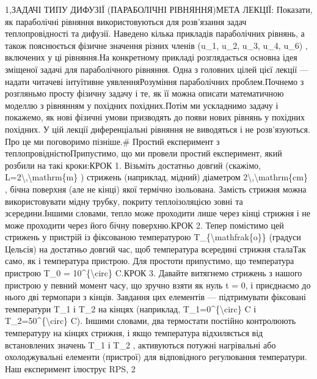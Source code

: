 \documentclass[
  ukrainian,
]{article}
\begin{document}
{{1,}{ЗАДАЧІ ТИПУ ДИФУЗІЇ (ПАРАБОЛІЧНІ РІВНЯННЯ)МЕТА ЛЕКЦІЇ: Показати, як параболічні рівняння використовуються для розв'язання задач теплопровідності та дифузії. Наведено кілька прикладів параболічних рівнянь, а також пояснюється фізичне значення різних членів (u\_1, u\_2, u\_3, u\_4, u\_6) , включених у ці рівняння.На конкретному прикладі розглядається основна ідея зміщеної задачі для параболічного рівняння. Одна з головних цілей цієї лекції --- надати читачеві інтуїтивне уявленняРозуміння параболічних проблем.Почнемо з розгляньмо просту фізичну задачу і те, як її можна описати математичною моделлю з рівнянням у похідних похідних.Потім ми ускладнимо задачу і покажемо, як нові фізичні умови призводять до появи нових рівнянь у похідних похідних. У цій лекції диференціальні рівняння не виводяться і не розв'язуються. Про це ми поговоримо пізніше.\# Простий експеримент з теплопровідністюПрипустимо, що ми провели простий експеримент, який розбили на такі кроки:КРОК 1. Візьміть достатньо довгий (скажімо, L=2\textbackslash,\textbackslash mathrm\{m\} ) стрижень (наприклад, мідний) діаметром 2\textbackslash,\textbackslash mathrm\{cm\} , бічна поверхня (але не кінці) якої термічно ізольована. Замість стрижня можна використовувати мідну трубку, покриту теплоізоляцією зовні та зсередини.Іншими словами, тепло може проходити лише через кінці стрижня і не може проходити через його бічну поверхню.КРОК 2. Тепер помістимо цей стрижень у пристрій із фіксованою температурою T\_\{\textbackslash mathfrak\{o\}\} (градуси Цельсія) на достатньо довгий час, щоб температура всередині стрижня сталаТак само, як і температура пристрою. Для простоти припустимо, що температура пристрою T\_0 = 10\^{}\{\textbackslash circ\} C.КРОК 3. Давайте витягнемо стрижень з нашого пристрою у певний момент часу, що зручно взяти як нуль t = 0, і приєднаємо до нього дві термопари з кінців. Завдання цих елементів --- підтримувати фіксовані температури T\_1 і T\_2 на кінцях (наприклад, T\_1=0\^{}\{\textbackslash circ\} C і T\_2=50\^{}\{\textbackslash circ\} C). Іншими словами, два термостати постійно контролюють температуру на кінцях стрижня, і якщо температура відхиляється від встановлених значень T\_1 і T\_2 , активуються потужні нагрівальні або охолоджувальні елементи (пристрої) для відповідного регулювання температури. Наш експеримент ілюструє RPS, 2 }}
\end{document}
